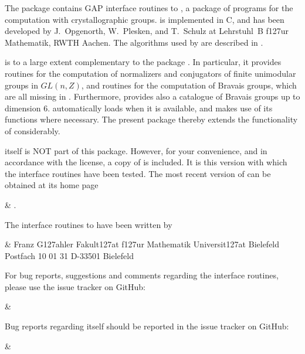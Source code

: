 

The package {\CaratInterface} contains GAP interface routines to {\CARAT}, 
a package of programs for the computation with crystallographic
groups. {\CARAT} is implemented in C, and has been developed by
J.~Opgenorth, W.~Plesken, and T.~Schulz at Lehrstuhl~B f\accent127ur 
Mathematik, RWTH Aachen. The algorithms used by {\CARAT} are described 
in \cite{OPS98}. 

{\CARAT} is to a large extent complementary to the {\GAP} package
{\Cryst}. In particular, it provides routines for the computation 
of normalizers and conjugators of finite unimodular groups in $GL(n,Z)$,
and routines for the computation of Bravais groups, which are all 
missing in {\Cryst}.  Furthermore, {\CARAT} provides also a catalogue of 
Bravais groups up to dimension 6. {\Cryst} automatically loads {\CARAT}
when it is available, and makes use of its functions where necessary. 
The present package thereby extends the functionality of {\Cryst} 
considerably.

{\CARAT} itself is NOT part of this package. However, for your convenience,
and in accordance with the {\CARAT} license, a copy of {\CARAT} is 
included. It is this version with which the interface routines 
have been tested. The most recent version of {\CARAT} can be obtained at 
its home page

\beginitems
&
.
\enditems
 
The {\GAP} interface routines to {\CARAT} have been written by

\beginitems
&
Franz G\accent127ahler\hfill\break
Fakult\accent127at f\accent127ur Mathematik\hfill\break
Universit\accent127at Bielefeld\hfill\break
Postfach 10 01 31\hfill\break
D-33501 Bielefeld\hfill\break
{}
\enditems

For bug reports, suggestions and comments regarding the interface routines, 
please use the issue tracker on GitHub:

\beginitems
&
\enditems

Bug reports regarding {\CARAT} itself should be reported in the
{\CARAT} issue tracker on GitHub:

\beginitems
&
\enditems

